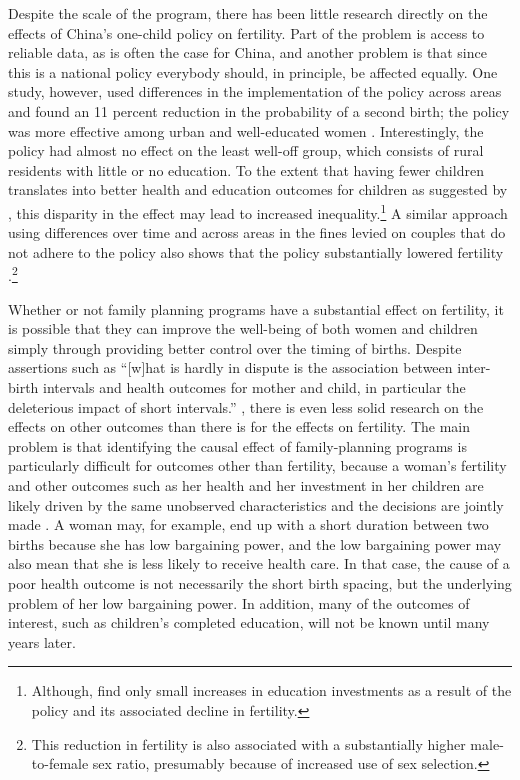 Despite the scale of the program, there has been little research directly on the effects of China's one-child policy on fertility. Part of the problem is access to reliable data, as is often the case for China, and another problem is that since this is a national policy everybody should, in principle, be affected equally. One study, however, used differences in the implementation of the policy across areas and found an 11 percent reduction in the probability of a second birth; the policy was more effective among urban and well-educated women \citep{Li2005}. Interestingly, the policy had almost no eﬀect on the least well-oﬀ group, which consists of rural residents with little or no education. To the extent that having fewer children translates into better health and education outcomes for children as suggested by \citet{becker73}, this disparity in the effect may lead to increased inequality.\footnote{Although, \citet{Rosenzweig2009} find only small increases in education investments as a result of the policy and its associated decline in fertility.} A similar approach using differences over time and across areas in the fines levied on couples that do not adhere to the policy also shows that the policy substantially lowered fertility \citep{Ebenstein2010}.\footnote{This reduction in fertility is also associated with a substantially higher male-to-female sex ratio, presumably because of increased use of sex selection.}

Whether or not family planning programs have a substantial effect on fertility, it is possible that they can improve the well-being of both women and children simply through providing better control over the timing of births. Despite assertions such as ``{{[}}w{{]}}hat is hardly in dispute is the association between inter-birth intervals and health outcomes for mother and child, in particular the deleterious impact of short intervals.'' \citep[p. 
175]{Casterline2016}, there is even less solid research on the effects on other outcomes than there is for the effects on fertility. The main problem is that identifying the causal effect of family-planning programs is particularly difficult for outcomes other than fertility, because a woman's fertility and other outcomes such as her health and her investment in her children are likely driven by the same unobserved characteristics and the decisions are jointly made \citep{Schultz2005}. A woman may, for example, end up with a short duration between two births because she has low bargaining power, and the low bargaining power may also mean that she is less likely to receive health care. In that case, the cause of a poor health outcome is not necessarily the short birth spacing, but the underlying problem of her low bargaining power. In addition, many of the outcomes of interest, such as children's completed education, will not be known until many years later.

